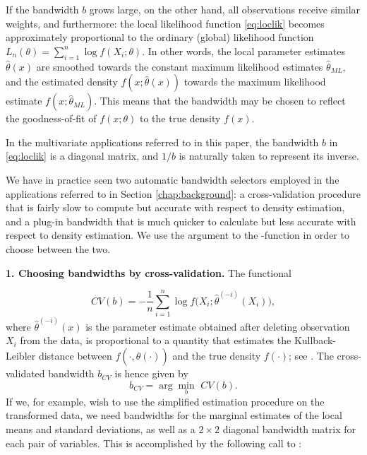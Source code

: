 If the bandwidth \(b\) grows large, on the other hand, all observations receive similar weights, and furthermore: the local likelihood function \eqref{eq:loclik} becomes approximately proportional to the ordinary (global) likelihood function \(L_n\left(\theta\right) = \sum_{i=1}^n\log f\left(X_i;\theta\right)\). In other words, the local parameter estimates \(\widehat \theta\left(x\right)\) are smoothed towards the constant maximum likelihood estimates \(\widehat\theta_{ML}\), and the estimated density \(f\left(x;\widehat\theta\left(x\right)\right)\) towards the maximum likelihood estimate \(f\left(x;\widehat\theta_{ML}\right)\). This means that the bandwidth may be chosen to reflect the goodness-of-fit of \(f\left(x;\theta\right)\) to the true density \(f\left(x\right)\).

In the multivariate applications referred to in this paper, the bandwidth \(b\) in \eqref{eq:loclik} is a diagonal matrix, and \(1/b\) is
naturally taken to represent its inverse. 

We have in practice seen two automatic bandwidth selectors employed in the applications referred to in Section \ref{chap:background}: a
cross-validation procedure that is fairly slow to compute but accurate with respect to density estimation, and a plug-in bandwidth that is much quicker to calculate but less accurate with respect to density estimation. We use the argument
 to the -function in order to choose between the two.

\textbf{1. Choosing bandwidths by cross-validation.} The functional

\[CV\left(b\right) = -\frac{1}{n}\sum_{i=1}^n \log f\Big(X_i; \widehat\theta^{\left(-i\right)}\left(X_i\right)\Big),\]
where \(\widehat\theta^{\left(-i\right)}\left(x\right)\) is the parameter estimate obtained after deleting observation \(X_i\) from the data, is proportional to a quantity that estimates the Kullback-Leibler distance between \(f\left(\cdot, \widehat\theta\left(\cdot\right)\right)\) and the true density \(f\left(\cdot\right)\); see \citet{bere:tjos:2014}. The cross-validated bandwidth \(b_{CV}\) is hence given by \[b_{CV} = \arg\min_b \,\, CV\left(b\right).\] If we, for example, wish to use the simplified estimation procedure on the transformed data, we need bandwidths for the marginal estimates of the local means and standard deviations, as well as a \(2\times2\) diagonal bandwidth matrix for each pair of variables. This is accomplished by the following call to :


